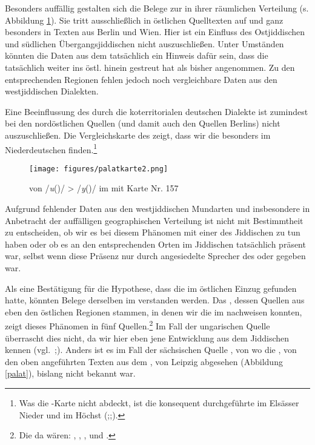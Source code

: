  Besonders auffällig gestalten sich die Belege zur  in ihrer räumlichen Verteilung (s. Abbildung \ref{kartepalat}). Sie tritt ausschließlich in östlichen Quelltexten auf und ganz besonders in Texten aus Berlin und Wien. Hier ist ein Einfluss des Ostjiddischen und südlichen Übergangsjiddischen nicht auszuschließen. Unter Umständen könnten die Daten aus dem  tatsächlich ein Hinweis dafür sein, dass die  tatsächlich weiter ins östl. \hai{{\WJ}} hinein gestreut hat als bisher angenommen. Zu den entsprechenden Regionen fehlen jedoch noch vergleichbare Daten aus den westjiddischen Dialekten. 
 
 Eine Beeinflussung des  durch die koterritorialen deutschen Dialekte ist zumindest bei den nordöstlichen Quellen (und damit auch den Quellen Berlins) nicht auszuschließen. Die Vergleichskarte des  zeigt, dass wir die  besonders im Niederdeutschen finden.\footnote{Was die -Karte nicht abdeckt, ist die konsequent durchgeführte  im Elsässer Nieder und im Höchst (\citealt[208–210]{Schirmunski1962};\citealt[831]{Wiesinger1983a};\citeyear[1052]{Wiesinger1983b}).}

  \begin{figure}
		\centering
\texttt{[image: figures/palatkarte2.png]}
		\caption{\label{kartepalat}  von /\textit{u}(\textlengthmark)/ > /\textit{y}(\textlengthmark)/ im  mit  Karte Nr. 157}
		\end{figure}

 
 
 Aufgrund fehlender Daten aus den westjiddischen Mundarten und insbesondere in Anbetracht der auffälligen geographischen Verteilung ist nicht mit Bestimmtheit zu entscheiden, ob wir es bei diesem Phänomen mit einer   des Jiddischen zu tun haben oder ob es an den entsprechenden Orten im Jiddischen tatsächlich präsent war, selbst wenn diese Präsenz nur durch angesiedelte Sprecher des  oder \hai{{\SOJ}} gegeben war. 
 
Als eine Bestätigung für die Hypothese, dass die  im östlichen \hai{{\WJ}} Einzug gefunden hatte, könnten Belege derselben im  verstanden werden. Das , dessen Quellen aus eben den östlichen Regionen stammen, in denen wir die  im  nachweisen konnten, zeigt dieses Phänomen in fünf Quellen.\footnote{Die da wären: , , ,  und .} Im Fall der ungarischen Quelle  überrascht dies nicht, da wir hier eben jene Entwicklung aus dem Jiddischen kennen (vgl.\, \citealt{Hutterer1965};\citealt[83]{Herzog1992}). Anders ist es im Fall der sächsischen Quelle , von wo die , von den oben angeführten Texten aus dem , von Leipzig abgesehen (Abbildung \ref{palat}), bislang nicht bekannt war.
 

